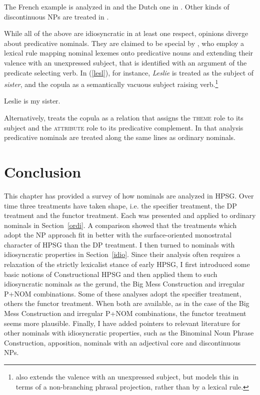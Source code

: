 \documentclass[output=paper
	        ,collection
	        ,collectionchapter
 	        ,biblatex
                ,babelshorthands
                ,newtxmath
                ,draftmode
                ,colorlinks, citecolor=brown
]{langscibook}
\begin{document}
\noindent
The French example is analyzed in \citet[20--21]{Abeilleetal04} and the Dutch one in 
\citet[47--50]{VanEynde04}. Other kinds of discontinuous NPs are treated in \citet{deKuthy2002a}. 

While all of the above are idiosyncratic in at least one respect, opinions diverge about 
predicative nominals. They are claimed to be special by \citet[409]{GS00}, who 
employ a lexical rule mapping nominal lexemes onto predicative nouns and 
extending their valence with an unexpressed subject, that is identified with an argument of the 
predicate selecting verb. In (\ref{lesl}), for instance, \emph{Leslie} is treated as the subject 
of \emph{sister}, and the copula as a semantically vacuous subject raising 
verb.\footnote{\citet[225]{MuellerPredication} also extends the valence with an unexpressed subject, 
but models this in terms of a non-branching phrasal projection, rather than by a lexical rule.}   

\begin{exe} 
\ex\label{lesl}   Leslie is my sister. 
\end{exe} 
   
\noindent
Alternatively, \citet[158--163]{VanEynde15} treats the copula as a relation that assigns the \textsc{theme} 
role to its subject and the \textsc{attribute} role to its predicative complement. In that analysis 
predicative nominals are treated along the same lines as ordinary nominals.  
  

\section{Conclusion} 


This chapter has provided a survey of how nominals are analyzed in HPSG. 
Over time three treatments have taken shape, i.e. the specifier treatment, 
the DP treatment and the functor treatment. 
Each was presented and applied to ordinary nominals in Section~\ref{ordi}. 
A comparison showed that the treatments which adopt the NP approach fit in better with 
the surface-oriented monostratal character of HPSG than the DP treatment.
I then turned to nominals with idiosyncratic properties in Section~\ref{idio}.
Since their analysis often requires a relaxation of the strictly lexicalist stance of early HPSG, 
I first introduced some basic notions of Constructional HPSG and then applied them to 
such idiosyncratic nominals as the gerund, the Big Mess Construction and irregular P+NOM combinations.  
Some of these analyses adopt the specifier treatment, others the functor treatment. 
When both are available, as in the case of the Big Mess Construction and  
irregular P+NOM combinations, the functor treatment seems more plausible. 
Finally, I have added pointers to relevant literature for other nominals with idiosyncratic properties,
such as the Binominal Noun Phrase Construction, apposition, nominals with an adjectival core  
and discontinuous NPs. 
\end{document}
